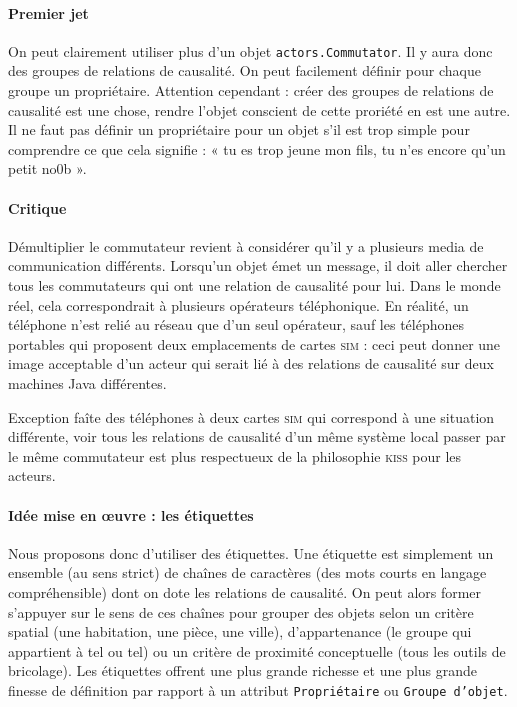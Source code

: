 \documentclass[11pt]{article}
\begin{document}
\paragraph{Premier jet} On peut clairement utiliser plus d'un objet \texttt{actors.Commutator}. Il y aura donc des groupes de relations de causalité. On peut facilement définir pour chaque groupe un propriétaire. Attention cependant : créer des groupes de relations de causalité est une chose, rendre l'objet conscient de cette proriété en est une autre. Il ne faut pas définir un propriétaire pour un objet s'il est trop simple pour comprendre ce que cela signifie : « tu es trop jeune mon fils, tu n'es encore qu'un petit no0b ».

\paragraph{Critique} Démultiplier le commutateur revient à considérer qu'il y a plusieurs media de communication différents. Lorsqu'un objet émet un message, il doit aller chercher tous les commutateurs qui ont une relation de causalité pour lui. Dans le monde réel, cela correspondrait à plusieurs opérateurs téléphonique. En réalité, un téléphone n'est relié au réseau que d'un seul opérateur, 
sauf les téléphones portables qui proposent deux emplacements de cartes \textsc{sim} : ceci peut donner une image acceptable d'un acteur qui serait lié à des relations de causalité sur deux machines Java différentes. 

Exception faîte des téléphones à deux cartes \textsc{sim} qui correspond à une situation différente, voir tous les relations de causalité d'un même système local passer par le même commutateur est plus respectueux de la philosophie \textsc{kiss} pour les acteurs.

\paragraph{Idée mise en œuvre : les étiquettes} Nous proposons donc d'utiliser des étiquettes. Une étiquette est simplement un ensemble (au sens strict) de chaînes de caractères (des mots courts en langage compréhensible) dont on dote les relations de causalité. On peut alors former s'appuyer sur le sens de ces chaînes pour grouper des objets selon un critère spatial (une habitation, une pièce, une ville), d'appartenance (le groupe qui appartient à tel ou tel) ou un critère de proximité conceptuelle (tous les outils de bricolage). Les étiquettes offrent une plus grande richesse et une plus grande finesse de définition par rapport à un attribut \texttt{Propriétaire} ou \texttt{Groupe d'objet}.
\end{document}
